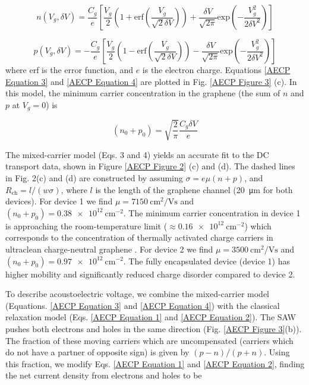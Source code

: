 \documentclass[double,12pt,1in,seploa]{beavtex}
\begin{document}

\begin{equation}
    n(V_g, \delta V) = \frac{C_g}{e}\left[\frac{V_g}{2}\left(1+\mathrm{erf}\left(\frac{V_g}{\sqrt{2}\delta V}\right)\right)+\frac{\delta V}{\sqrt{2\pi}}\mathrm{exp}\left(-\frac{V_g^2}{2\delta V^2}\right)\right]
    \label{AECP Equation 3}
\end{equation}

\begin{equation}
    p(V_g, \delta V) = -\frac{C_g}{e}\left[\frac{V_g}{2}\left(1-\mathrm{erf}\left(\frac{V_g}{\sqrt{2}\delta V}\right)\right)-\frac{\delta V}{\sqrt{2\pi}}\mathrm{exp}\left(-\frac{V_g^2}{2\delta V^2}\right)\right]
    \label{AECP Equation 4}
\end{equation}
where erf is the error function, and $e$ is the electron charge. Equations \ref{AECP Equation 3} and \ref{AECP Equation 4} are plotted in Fig. \ref{AECP Figure 3} (c). In this model, the minimum carrier concentration in the graphene (the sum of $n$ and $p$ at $V_g = 0$) is 

\begin{equation}
    (n_0 + p_0) = \sqrt{\frac{2}{\pi}}\frac{C_g \delta V}{e}
    \label{AECP Equation 5}
\end{equation}

The mixed-carrier model (Eqs. 3 and 4) yields an accurate fit to the DC transport data, shown in Figure \ref{AECP Figure 2} (c) and (d). The dashed lines in Fig. 2(c) and (d) are constructed by assuming $\sigma = e\mu(n + p)$, and $R_{\mathrm{ch}} = l/(w\sigma)$, where $l$ is the length of the graphene channel (\SI{20}{\micro\meter} for both devices). For device 1 we find $\mu = \SI{7150}{\centi\meter^2/\volt\second}$ and $(n_0+p_0) =  \SI{0.38e12}{\centi\meter^{-2}}$. The minimum carrier concentration in device 1 is approaching the room-temperature limit ($\approx \SI{0.16e12}{\centi\meter^{-2}}$) which corresponds to the concentration of thermally activated charge carriers in ultraclean charge-neutral graphene \cite{xin_giant_2023}.  For device 2 we find $\mu = \SI{3500}{\centi\meter^2/\volt\second}$ and $(n_0+p_0) =\SI{0.97e12}{\centi\meter^{-2}}$. The fully encapsulated device (device 1) has higher mobility and significantly reduced charge disorder compared to device 2. 

To describe acoustoelectric voltage, we combine the mixed-carrier model (Equations. \ref{AECP Equation 3} and \ref{AECP Equation 4}) with the classical relaxation model (Eqs. \ref{AECP Equation 1} and \ref{AECP Equation 2}). The SAW pushes both electrons and holes in the same direction (Fig. \ref{AECP Figure 3}(b)). The fraction of these moving carriers which are uncompensated (carriers which do not have a partner of opposite sign) is given by $(p-n)/(p+n)$.  Using this fraction, we modify Eqs. \ref{AECP Equation 1} and \ref{AECP Equation 2}, finding the net current density from electrons and holes to be
\end{document}
